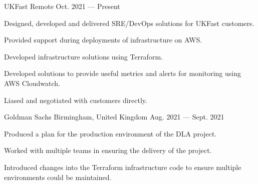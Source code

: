 

\begin{cventries}

    {UKFast}
    {Remote}
    {Oct. 2021 — Present}
    {
        \begin{cvitems}
	    \item{Designed, developed and delivered SRE/DevOps solutions for UKFast customers.}
            \item{Provided support during deployments of infrastructure on AWS.}
            \item{Developed infrastructure solutions using Terraform.}
            \item{Developed solutions to provide useful metrics and alerts for monitoring using AWS Cloudwatch.}
	    \item{Liased and negotiated with customers directly.}
        \end{cvitems}
    }
    {Goldman Sachs}
    {Birmingham, United Kingdom}
    {Aug. 2021 — Sept. 2021}
    {
        \begin{cvitems}
	    \item{Produced a plan for the production environment of the DLA project.}
            \item{Worked with multiple teams in ensuring the delivery of the project.}
	    \item{Introduced changes into the Terraform infrastructure code to ensure multiple environments could be maintained.}
        \end{cvitems}
    }


\end{cventries}
